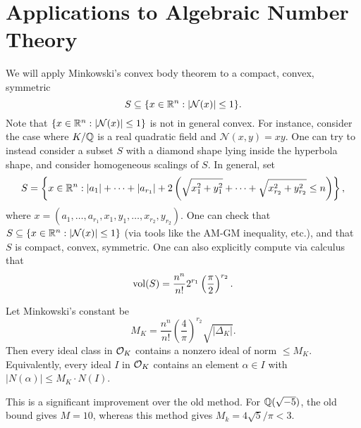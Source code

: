 \section{Applications to Algebraic Number Theory}
\begin{remark}
  We will apply Minkowski's convex body theorem
  to a compact, convex, symmetric
  \[
    S \subseteq \{x \in \mathbb{R}^n : |\mathcal{N}(x)| \le 1\}.
  \]
  Note that $\{x \in \mathbb{R}^n : |\mathcal{N}(x)| \le 1\}$ is
  not in general convex. For instance, consider the case
  where $K / \mathbb{Q}$ is a real quadratic field and
  $\mathcal{N}(x, y) = xy$. One can try to instead
  consider a subset $S$ with a
  diamond shape lying inside the
  hyperbola shape, and consider homogeneous
  scalings of $S$. In general, set
  \[
    S = \left\{x \in \mathbb{R}^n : |a_1| + \dots + |a_{r_1}| + 2\left(\sqrt{x_1^2 + y_1^2} + \dots + \sqrt{x_{r_2}^2 + y_{r_2}^2} \le n\right)\right\},
  \]
  where $x = (a_1, \dots, a_{r_1}, x_1, y_1, \dots, x_{r_2}, y_{r_2})$.
  One can check that $S \subseteq \{x \in \mathbb{R}^n : |\mathcal{N}(x)| \le 1\}$
  (via tools like the AM-GM inequality, etc.), and
  that $S$ is compact, convex, symmetric.
  One can also explicitly compute via calculus that
  \[
    \operatorname{vol}(S) = \frac{n^n}{n!} 2^{r_1} \left(\frac{\pi}{2}\right)^{r_2}.
  \]
\end{remark}

\begin{corollary}
  Let Minkowski's constant be
  \[
    M_K = \frac{n^n}{n!} \left(\frac{4}{\pi}\right)^{r_2} \sqrt{|\Delta_K|}.
  \]
  Then every ideal class in $\mathcal{O}_K$ contains
  a nonzero ideal of norm $\le M_K$. Equivalently,
  every ideal $I$ in $\mathcal{O}_K$ contains an element
  $\alpha \in I$ with $|N(\alpha)| \le M_K \cdot N(I)$.
\end{corollary}

\begin{remark}
  This is a significant improvement over the old method.
  For $\mathbb{Q}(\sqrt{-5})$, the old bound gives
  $M = 10$, whereas this method gives
  $M_k = 4\sqrt{5} / \pi < 3$.
\end{remark}
